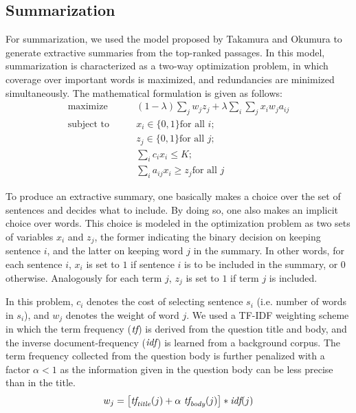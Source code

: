 \documentclass[a4paper,10pt,conference,compsocconf,final]{IEEEtran}
\newcommand{\var}[1]{\mbox{\emph{#1}}}
\begin{document}
{{{{\subsection{Summarization}
\label{sec:sum}

For summarization, we used the model proposed by Takamura and Okumura
\cite{takamura2009text} to generate extractive summaries from the
top-ranked passages.
In this model, summarization is characterized as a two-way
optimization problem, in which coverage over important words is
maximized, and redundancies are minimized simultaneously.
The mathematical formulation is given as follows:
\begin{equation}
\begin{split}
  \textrm{maximize} \qquad & (1-\lambda) \sum_{j} w_j z_j + \lambda \sum_{i}\sum_{j} x_i w_j a_{ij} \\
  \textrm{subject to} \qquad 
       & x_i \in \{0,1\} \textrm{for all $i$}; \\ 
       & z_j \in \{0,1\} \textrm{for all $j$}; \\
       & \sum_{i} c_ix_i \le K; \\
       & \sum_{i}^{} a_{ij}x_i \ge z_j \textrm{for all $j$} 
\end{split}
\end{equation}

To produce an extractive summary, one basically makes a choice over
the set of sentences and decides what to include.
By doing so, one also makes an implicit choice over words.
This choice is modeled in the optimization problem as two sets of
variables $x_i$ and $z_j$, the former indicating the binary decision
on keeping sentence $i$, and the latter on keeping word $j$ in
the summary.
In other words, for each sentence $i$, $x_i$ is set to $1$ if sentence
$i$ is to be included in the summary, or $0$ otherwise.
Analogously for each term $j$, $z_j$ is set to $1$ if term $j$ is
included.

In this problem, $c_i$ denotes the cost of selecting sentence $s_i$ (i.e.
number of words in $s_i$), and $w_j$ denotes the weight of word $j$.
We used a TF-IDF weighting scheme in which the term frequency ($\var{tf}$) is
derived from the question title and body, and the inverse document-frequency
($\var{idf}$) is learned from a background corpus.
The term frequency collected from the question body is further penalized with
a factor $\alpha < 1$ as the information given in the question body can
be less precise than in the title.
\begin{equation}
  w_j = \left[ \var{tf}_{\var{title}}(j) + \alpha ~ \var{tf}_{\var{body}}(j) \right] * \var{idf}(j)
\end{equation}

}}}}
\end{document}
